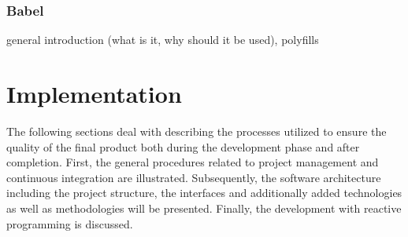 \documentclass[Bachelor,BIF,english]{twbook}
\begin{document}
\subsection{Babel}
general introduction (what is it, why should it be used), 
polyfills \cite[p.~18]{RxAngular5Prj}

\clearpage 

\chapter{Implementation}
The following sections deal with describing the processes utilized to ensure the quality of the final product both during the development phase and after completion. First, the general procedures related to project management and continuous integration are illustrated. Subsequently, the software architecture including the project structure, the interfaces and additionally added technologies as well as methodologies will be presented. Finally, the development with reactive programming is discussed.
\end{document}
